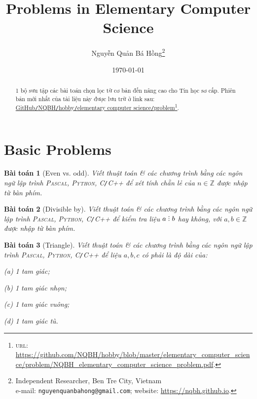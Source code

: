 \documentclass{article}
\title{Problems in Elementary Computer Science}
\author{Nguyễn Quản Bá Hồng\footnote{Independent Researcher, Ben Tre City, Vietnam\\e-mail: \texttt{nguyenquanbahong@gmail.com}; website: \url{https://nqbh.github.io}.}}
\date{\today}
\numberwithin{equation}{section}
\newtheorem{baitoan}{Bài toán}[section]
\DeclareRobustCommand{\divby}{%
	\mathrel{\vbox{\baselineskip.65ex\lineskiplimit0pt\hbox{.}\hbox{.}\hbox{.}}}%
}
\begin{document}
\maketitle
\begin{abstract}
	1 bộ sưu tập các bài toán chọn lọc từ cơ bản đến nâng cao cho Tin học sơ cấp. Phiên bản mới nhất của tài liệu này được lưu trữ ở link sau: \href{https://github.com/NQBH/hobby/blob/master/elementary_computer_science/problem/NQBH_elementary_computer_science_problem.pdf}{GitHub\texttt{/}NQBH\texttt{/}hobby\texttt{/}elementary computer science\texttt{/}problem}\footnote{\textsc{url}: \url{https://github.com/NQBH/hobby/blob/master/elementary_computer_science/problem/NQBH_elementary_computer_science_problem.pdf}.}.
\end{abstract}
\tableofcontents
\newpage


\section{Basic Problems}

\begin{baitoan}[Even vs. odd]
	Viết thuật toán \& các chương trình bằng các ngôn ngữ lập trình \textsc{Pascal, Python, C\texttt{/}C++} để xét tính chẵn lẻ của $n\in\mathbb{Z}$ được nhập từ bàn phím.
\end{baitoan}

\begin{baitoan}[Divisible by]
	Viết thuật toán \& các chương trình bằng các ngôn ngữ lập trình \textsc{Pascal, Python, C\texttt{/}C++} để kiểm tra liệu $a\divby b$ hay không, với $a,b\in\mathbb{Z}$ được nhập từ bàn phím.
\end{baitoan}

\begin{baitoan}[Triangle]
	Viết thuật toán \& các chương trình bằng các ngôn ngữ lập trình \textsc{Pascal, Python, C\texttt{/}C++} để liệu $a,b,c$ có phải là độ dài của:
	\begin{enumerate*}
		\item[(a)] 1 tam giác;
		\item[(b)] 1 tam giác nhọn;
		\item[(c)] 1 tam giác vuông;
		\item[(d)] 1 tam giác tù.
	\end{enumerate*}
\end{baitoan}
\end{document}
